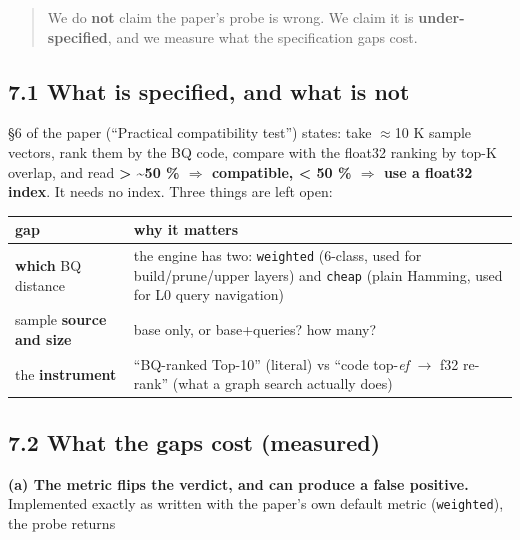 \documentclass[
  10pt,
]{article}
\newcounter{none} %
\begin{document}
\begin{quote}
We do \textbf{not} claim the paper's probe is wrong. We claim it is
\textbf{under-specified}, and we measure what the specification gaps
cost.
\end{quote}

\subsection{7.1 What is specified, and what is
not}\label{what-is-specified-and-what-is-not}

§6 of the paper (``Practical compatibility test'') states: take $\approx$10 K
sample vectors, rank them by the BQ code, compare with the float32
ranking by top-K overlap, and read \textbf{\textgreater{}
\textasciitilde50 \% $\Rightarrow$ compatible, \textless{} 50 \% $\Rightarrow$ use a float32
index}. It needs no index. Three things are left open:

{\def\LTcaptype{none} %
\begin{longtable}[]{@{}
  >{\raggedright\arraybackslash}p{}
  >{\raggedright\arraybackslash}p{}@{}}
\toprule\noalign{}
\begin{minipage}[b]{\linewidth}\raggedright
gap
\end{minipage} & \begin{minipage}[b]{\linewidth}\raggedright
why it matters
\end{minipage} \\
\midrule\noalign{}
\endhead
\bottomrule\noalign{}
\endlastfoot
\textbf{which} BQ distance & the engine has two: \texttt{weighted}
(6-class, used for build/prune/upper layers) and \texttt{cheap} (plain
Hamming, used for L0 query navigation) \\
sample \textbf{source and size} & base only, or base+queries? how
many? \\
the \textbf{instrument} & ``BQ-ranked Top-10'' (literal) vs ``code
top-\emph{ef} $\rightarrow$ f32 re-rank'' (what a graph search actually does) \\
\end{longtable}
}

\subsection{7.2 What the gaps cost
(measured)}\label{what-the-gaps-cost-measured}

\textbf{(a) The metric flips the verdict, and can produce a false
positive.} Implemented exactly as written with the paper's own default
metric (\texttt{weighted}), the probe returns
\end{document}

